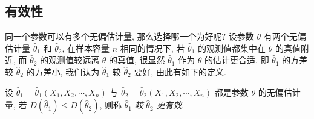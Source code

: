 \subsection{有效性}

同一个参数可以有多个无偏估计量, 那么选择哪一个为好呢? 设参数 $ \theta $ 有两个无偏估计量 $ \hat{\theta}_{1} $ 和 $ \hat{\theta}_{2}$, 
在样本容量 $ n $ 相同的情况下, 若 $ \hat{\theta}_{1} $ 的观测值都集中在 $ \theta $ 的真值附近, 
而 $\hat{\theta}_{2}$ 的观测值较远离 $\theta$ 的真值, 很显然 $\hat{\theta}_{1}$ 作为 $\theta$ 的估计更合适.
即 $\hat{\theta}_{1}$ 的方差较 $\hat{\theta}_{2}$ 的方差小, 我们认为 $\hat{\theta}_{1}$ 较 $\hat{\theta}_{2}$ 要好, 由此有如下的定义.

\begin{definition}[有效性]
    设 $ \hat{\theta}_{1}=\hat{\theta}_{1}\left(X_{1}, X_{2}, \cdots, X_{n}\right) $ 与 $ \hat{\theta}_{2}=\hat{\theta}_{2}\left(X_{1}, X_{2}, \cdots, X_{n}\right)$
    都是参数 $ \theta $ 的无偏估计量, 若 $ D\left(\hat{\theta}_{1}\right) \leqslant D\left(\hat{\theta}_{2}\right) $, 则称 $ \hat{\theta}_{1} $ \textit{较} $ \hat{\theta}_{2} $ \textit{更有效}.
\end{definition}

    

